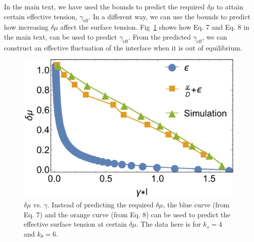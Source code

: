 \documentclass[amsmath,preprintnumbers,10pt,nofootinbib,prl,twocolumn]{revtex4-1}
\begin{document}
In the main text, we have used the bounds to predict the required $\delta \mu$ to attain certain effective tension, $\gamma_{\textrm{eff}}$. In a different way, we can use the bounds to predict how increasing $\delta \mu$ affect the surface tension. Fig~\ref{fig:epsilonpredict} shows how Eq. 7 and Eq. 8 in the main text, can be used to predict $\gamma_{\textrm{eff}}$. From the predicted $\gamma_{\textrm{eff}}$, we can construct an effective fluctuation of the interface when it is out of equilibrium. 
\begin{figure}[tbb]
\centering
\includegraphics[scale=0.5]{predictepsilonv2Fig4.pdf}
\caption{$\delta\mu$ vs. $\gamma$. Instead of predicting the required $\delta\mu$, the blue curve (from Eq. 7) and the orange curve (from Eq. 8) can be used to predict the effective surface tension at certain $\delta \mu$. The data here is for $k_s=4$ and $k_\theta = 6$.} \label{fig:epsilonpredict}
\end{figure}
%



\end{document}
